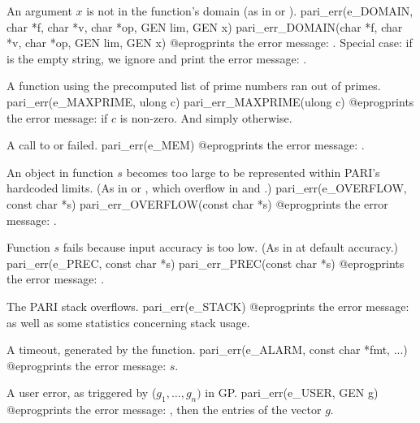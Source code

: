  An argument $x$ is not in the function's domain (as in
 or ).
\bprog
  pari_err(e_DOMAIN, char *f, char *v, char *op, GEN lim, GEN x)
  pari_err_DOMAIN(char *f, char *v, char *op, GEN lim, GEN x)
@eprog\noindent prints the error message: . Special case: if  is the empty string, we ignore
 and print the error message: .

 A function using the precomputed list of prime numbers
ran out of primes.
\bprog
  pari_err(e_MAXPRIME, ulong c)
  pari_err_MAXPRIME(ulong c)
@eprog\noindent prints the error message:  if $c$ is non-zero. And simply  otherwise.

 A call to  or  failed.
\bprog
  pari_err(e_MEM)
@eprog\noindent prints the error message: .

 An object in function $s$ becomes too large to be
represented within PARI's hardcoded limits. (As in 
or , which overflow in  and .)
\bprog
  pari_err(e_OVERFLOW, const char *s)
  pari_err_OVERFLOW(const char *s)
@eprog\noindent prints the error message: .

 Function $s$ fails because input accuracy is too low.
(As in  at default accuracy.)
\bprog
  pari_err(e_PREC, const char *s)
  pari_err_PREC(const char *s)
@eprog\noindent prints the error message: .

 The PARI stack overflows.
\bprog
  pari_err(e_STACK)
@eprog\noindent prints the error message: 
as well as some statistics concerning stack usage.


 A timeout, generated by the  function.
\bprog
  pari_err(e_ALARM, const char *fmt, ...)
@eprog\noindent prints the error message: $s$.

 A user error, as triggered by ($g_1,\dots,g_n)$
in GP.
\bprog
  pari_err(e_USER, GEN g)
@eprog\noindent prints the error message: , then the
entries of the vector $g$.

